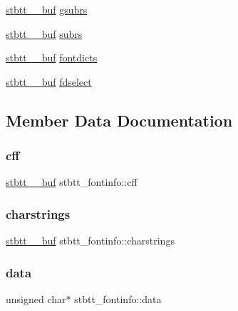\begin{DoxyCompactItemize}
\item 
\hyperlink{structstbtt____buf}{stbtt\+\_\+\+\_\+buf} \hyperlink{structstbtt__fontinfo_afc5bfc4a52ad0e3879f0f81a372da7fb}{gsubrs}
\item 
\hyperlink{structstbtt____buf}{stbtt\+\_\+\+\_\+buf} \hyperlink{structstbtt__fontinfo_aebc496bb1c001a8a90e0e66da16107d2}{subrs}
\item 
\hyperlink{structstbtt____buf}{stbtt\+\_\+\+\_\+buf} \hyperlink{structstbtt__fontinfo_a966c70ac9548a02fff558846fbce3677}{fontdicts}
\item 
\hyperlink{structstbtt____buf}{stbtt\+\_\+\+\_\+buf} \hyperlink{structstbtt__fontinfo_a4e06b1c29295a9aba529105e88fe1d71}{fdselect}
\end{DoxyCompactItemize}


\subsection{Member Data Documentation}
\hypertarget{structstbtt__fontinfo_a6031b4bda94aa2b5ff07ef5d626a15a4}{}\label{structstbtt__fontinfo_a6031b4bda94aa2b5ff07ef5d626a15a4} 
\subsubsection{\texorpdfstring{cff}{cff}}
{\footnotesize\ttfamily \hyperlink{structstbtt____buf}{stbtt\+\_\+\+\_\+buf} stbtt\+\_\+fontinfo\+::cff}

\hypertarget{structstbtt__fontinfo_aaf04a69f8dd4b6a8bed4191b57145082}{}\label{structstbtt__fontinfo_aaf04a69f8dd4b6a8bed4191b57145082} 
\subsubsection{\texorpdfstring{charstrings}{charstrings}}
{\footnotesize\ttfamily \hyperlink{structstbtt____buf}{stbtt\+\_\+\+\_\+buf} stbtt\+\_\+fontinfo\+::charstrings}

\hypertarget{structstbtt__fontinfo_af348db379cf0e0e71a68603d00501d41}{}\label{structstbtt__fontinfo_af348db379cf0e0e71a68603d00501d41} 
\subsubsection{\texorpdfstring{data}{data}}
{\footnotesize\ttfamily unsigned char$\ast$ stbtt\+\_\+fontinfo\+::data}

